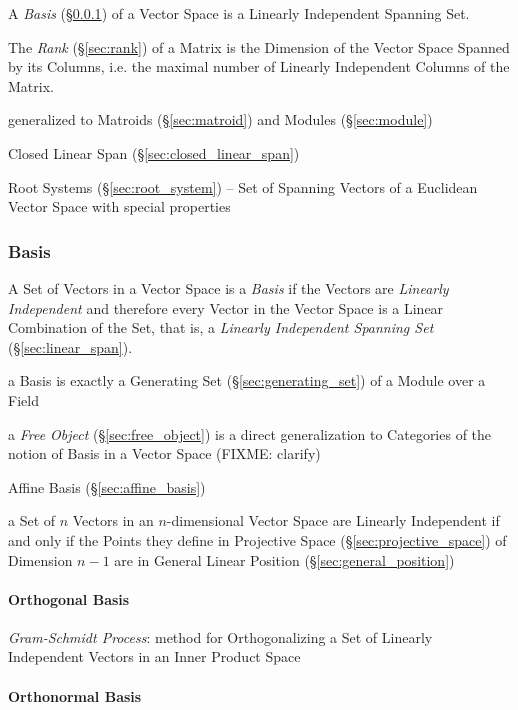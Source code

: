 A \emph{Basis} (\S\ref{sec:basis}) of a Vector Space is a Linearly Independent
Spanning Set.

The \emph{Rank} (\S\ref{sec:rank}) of a Matrix is the Dimension of the Vector
Space Spanned by its Columns, i.e. the maximal number of Linearly Independent
Columns of the Matrix.

generalized to Matroids (\S\ref{sec:matroid}) and Modules (\S\ref{sec:module})

Closed Linear Span (\S\ref{sec:closed_linear_span})

\fist Root Systems (\S\ref{sec:root_system}) -- Set of Spanning Vectors of a
Euclidean Vector Space with special properties



\subsubsection{Basis}\label{sec:basis}

A Set of Vectors in a Vector Space is a \emph{Basis} if the Vectors are
\emph{Linearly Independent} and therefore every Vector in the Vector Space is a
Linear Combination of the Set, that is, a \emph{Linearly Independent Spanning
  Set} (\S\ref{sec:linear_span}).

a Basis is exactly a Generating Set (\S\ref{sec:generating_set}) of a Module
over a Field

\fist a \emph{Free Object} (\S\ref{sec:free_object}) is a direct generalization
to Categories of the notion of Basis in a Vector Space
(FIXME: clarify)

\fist Affine Basis (\S\ref{sec:affine_basis})

a Set of $n$ Vectors in an $n$-dimensional Vector Space are Linearly
Independent if and only if the Points they define in Projective Space
(\S\ref{sec:projective_space}) of Dimension $n-1$ are in General Linear
Position (\S\ref{sec:general_position})



\paragraph{Orthogonal Basis}\label{sec:orthogonal_basis}\hfill

\emph{Gram-Schmidt Process}: method for Orthogonalizing a Set of Linearly
Independent Vectors in an Inner Product Space



\paragraph{Orthonormal Basis}\label{sec:orthonormal_basis}\hfill

